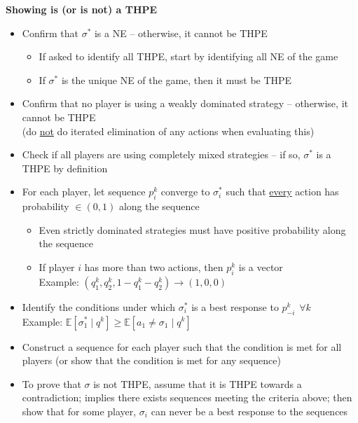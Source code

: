 \documentclass{report}
\newcommand{\FlowerSmall}{\mbox{\raisebox{-1pt}{\small\EightFlowerPetalRemoved}}} %
\begin{document}
\begin{mdframed}
	\medskip
	\begin{center} \textbf{{\large Showing \boldsymbol{$\sigma^*$} is (or is not) a THPE}} \end{center}
	\begin{itemize}[label=\FlowerSmall]
		\item{Confirm that $\sigma^*$ is a NE -- otherwise, it cannot be THPE}
			\begin{itemize}
			\item{If asked to identify all THPE, start by identifying all NE of the game}
			\item{If $\sigma^*$ is the unique NE of the game, then it must be THPE}
			\end{itemize}
		\item{Confirm that no player is using a weakly dominated strategy -- otherwise, it cannot be THPE\\ (do \underline{not} do iterated elimination of any actions when evaluating this)}
		\item{Check if all players are using completely mixed strategies -- if so, $\sigma^*$ is a THPE by definition}
		\item{For each player, let sequence $p_i^k$ converge to $\sigma_i^*$ such that \underline{every} action has probability $\in (0,1)$ along the sequence}
			\begin{itemize}
			\item{Even strictly dominated strategies must have positive probability along the sequence}
			\item{If player $i$ has more than two actions, then $p_i^k$ is a vector\\
				Example: $(q_1^k, q_2^k, 1-q_1^k-q_2^k) \rightarrow (1,0,0)$}
			\end{itemize}
		\item{Identify the conditions under which $\sigma_i^*$ is a best response to $p_{-i}^k \hspace{5pt} \forall k$}\\
		Example: $\mathbb{E}[\sigma_1^* \mid q^k] \geq \mathbb{E}[a_1 \neq \sigma_1 \mid q^k]$
		\item{Construct a sequence for each player such that the condition is met for all players (or show that the condition is met for any sequence)}
		\item{To prove that $\sigma$ is not THPE, assume that it is THPE towards a contradiction; implies there exists sequences meeting the criteria above; then show that for some player, $\sigma_i$ can never be a best response to the sequences}
	\end{itemize}
	\smallskip
\end{mdframed}
\end{document}
